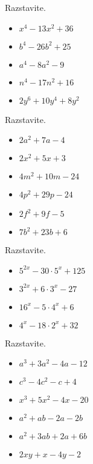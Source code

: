 \begin{multicols}{2}
    
        
            \begin{naloga}
                Razstavite.
                \begin{itemize}
                    \item $x^4-13x^2+36$ 
                    \item $b^4-26b^2+25$ 
                    \item $a^4-8a^2-9$ 
                    \item $n^4-17n^2+16$ 
                    \item $2y^6+10y^4+8y^2$ 
                \end{itemize}
            \end{naloga}
    
    
        
            \begin{naloga}
                Razstavite.
                \begin{itemize}
                    \item $2a^2+7a-4$ 
                    \item $2x^2+5x+3$ 
                    \item $4m^2+10m-24$ 
                    \item $4p^2+29p-24$ 
                    \item $2f^2+9f-5$ 
                    \item $7b^2+23b+6$ 
                \end{itemize}
            \end{naloga}
        
    
        
            \begin{naloga}
                Razstavite.
                \begin{itemize}
                    \item $5^{2x}-30\cdot 5^x+125$ 
                    \item $3^{2x}+6\cdot 3^x-27$ 
                    \item $16^x-5\cdot 4^x+6$ 
                    \item $4^x-18\cdot 2^x+32$ 
                \end{itemize}
            \end{naloga}
        
    
        
            \begin{naloga}
                Razstavite.
                \begin{itemize}
                    \item $a^3+3a^2-4a-12$ 
                    \item $c^3-4c^2-c+4$ 
                    \item $x^3+5x^2-4x-20$ 
                    \item $a^2+ab-2a-2b$ 
                    \item $a^2+3ab+2a+6b$ 
                    \item $2xy+x-4y-2$ 
                \end{itemize}
            \end{naloga}
        

\end{multicols}
